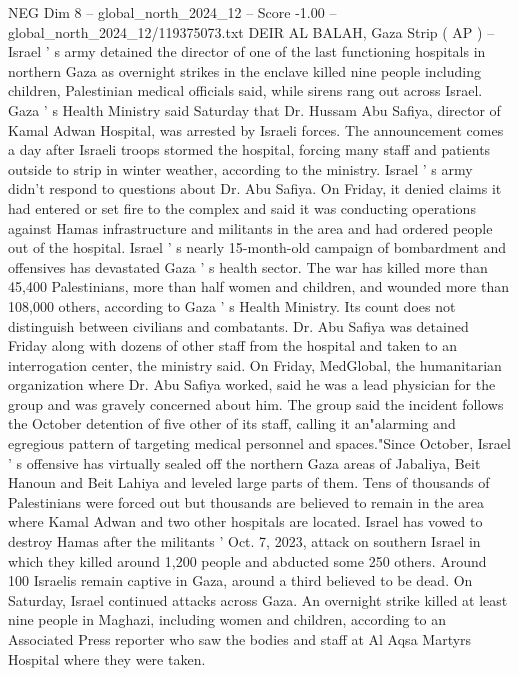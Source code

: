\begin{textsample}{NEG Dim 8 – global\_north\_2024\_12 – Score -1.00 – global\_north\_2024\_12/119375073.txt}  \label{ex:f8_neg_117}
DEIR AL BALAH, Gaza Strip ( AP ) -- Israel ' s army detained the director of one of the last functioning hospitals in northern Gaza as overnight strikes in the enclave killed nine people including children, Palestinian medical officials said, while sirens rang out across Israel.
Gaza ' s Health Ministry said Saturday that Dr.
Hussam Abu Safiya, director of Kamal Adwan Hospital, was arrested by Israeli forces.
The announcement comes a day after Israeli troops stormed the hospital, forcing many staff and patients outside to strip in winter weather, according to the ministry.
Israel ' s army didn't respond to questions about Dr.
Abu Safiya.
On Friday, it denied claims it had entered or set fire to the complex and said it was conducting operations against Hamas infrastructure and militants in the area and had ordered people out of the hospital.
Israel ' s nearly 15-month-old campaign of bombardment and offensives has devastated Gaza ' s health sector.
The war has killed more than 45,400 Palestinians, more than half women and children, and wounded more than 108,000 others, according to Gaza ' s Health Ministry.
Its count does not distinguish between civilians and combatants.
Dr.
Abu Safiya was detained Friday along with dozens of other staff from the hospital and taken to an interrogation center, the ministry said.
On Friday, MedGlobal, the humanitarian organization where Dr.
Abu Safiya worked, said he was a lead physician for the group and was gravely concerned about him.
The group said the incident follows the October detention of five other of its staff, calling it an"alarming and egregious pattern of targeting medical personnel and spaces."Since October, Israel ' s offensive has virtually sealed off the northern Gaza areas of Jabaliya, Beit Hanoun and Beit Lahiya and leveled large parts of them.
Tens of thousands of Palestinians were forced out but thousands are believed to remain in the area where Kamal Adwan and two other hospitals are located.
Israel has vowed to destroy Hamas after the militants ' Oct. 7, 2023, attack on southern Israel in which they killed around 1,200 people and abducted some 250 others.
Around 100 Israelis remain captive in Gaza, around a third believed to be dead.
On Saturday, Israel continued attacks across Gaza.
An overnight strike killed at least nine people in Maghazi, including women and children, according to an Associated Press reporter who saw the bodies and staff at Al Aqsa Martyrs Hospital where they were taken.

\end{textsample}
